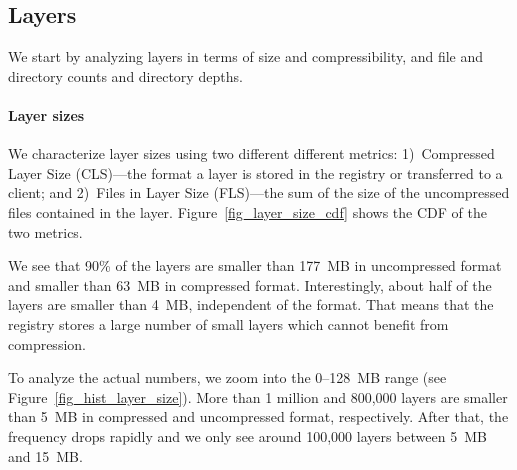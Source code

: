\subsection{Layers}
\label{sec:layers}

We start by analyzing layers in terms of size and compressibility, and file and directory
counts and directory depths.




\paragraph{Layer sizes}
%
We characterize layer sizes using two different different metrics:
%
1)~Compressed Layer Size (CLS)---the format a layer is stored in the registry or
transferred to a client;
%
%
and 2)~Files in Layer Size (FLS)---the sum of the size of the uncompressed files contained
in the layer.
%
Figure~\ref{fig_layer_size_cdf} shows the CDF of the two metrics.


We see that 90\% of the layers are smaller than 177~MB in uncompressed 
format and smaller than 63~MB in compressed format.
%
Interestingly, about half of the layers are smaller than 4~MB, independent
of the format. That means that the registry stores a large number of
small layers which cannot benefit from compression.
%
%

To analyze the actual numbers, we zoom into the 0--128~MB range
(see Figure~\ref{fig_hist_layer_size}).
%
More than 1 million and 800,000 layers are smaller than 5~MB
in compressed and uncompressed format, respectively. After that,
the frequency drops rapidly and we only see around 100,000 layers
between 5~MB and 15~MB.




